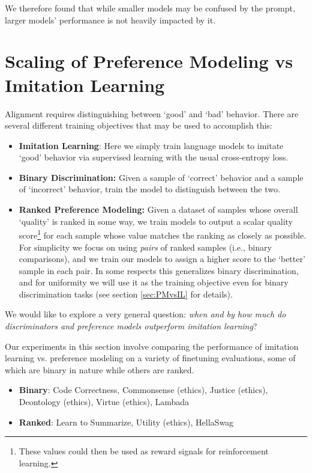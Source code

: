 We therefore found that  while smaller models may be confused by the prompt, larger models' performance is not heavily impacted by it.  

\section{Scaling of Preference Modeling vs Imitation Learning}
\label{sec:ScalingPMvsIL}

Alignment requires distinguishing between `good' and `bad' behavior.  There are several different training objectives that may be used to accomplish this:

\begin{itemize}
    \item {\bf Imitation Learning}: Here we simply train language models to imitate `good' behavior via supervised learning with the usual  cross-entropy loss. 
    \item {\bf Binary Discrimination:} Given a sample of `correct' behavior and a sample of `incorrect' behavior, train the model to distinguish between the two. 
    \item {\bf Ranked Preference Modeling:} Given a dataset of samples whose overall `quality' is ranked in some way, we train models to output a scalar quality score\footnote{These values could then be used as reward signals for reinforcement learning.} for each sample whose value matches the ranking as closely as possible. For simplicity we focus on using {\it pairs} of ranked samples (i.e., binary comparisons), and we train our models to assign a higher score to the `better' sample in each pair. In some respects this generalizes binary discrimination, and for uniformity we will use it as the training objective even for binary discrimination tasks (see section \ref{sec:PMvsIL} for details).
\end{itemize}

We would like to explore a very general question: \emph{when and by how much do discriminators and preference models outperform imitation learning}?  

Our experiments in this section involve comparing the performance of imitation learning vs. preference modeling on a variety of finetuning evaluations, some of which are binary in nature while others are ranked.

\begin{itemize}
    \item  {\bf Binary}: Code Correctness, Commonsense (ethics), Justice (ethics), Deontology (ethics), Virtue (ethics), Lambada \item  {\bf Ranked}: Learn to Summarize, Utility (ethics), HellaSwag
\end{itemize}

